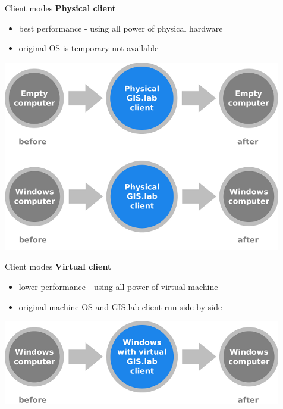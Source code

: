 \documentclass[12pt]{beamer}
\begin{document}
\begin{frame}{Client modes}
	\textbf{Physical client}
	\begin{itemize}
		\item best performance - using all power of physical hardware
		\item original OS is temporary not available 
	\end{itemize}
	\begin{center}
		\includegraphics[keepaspectratio=true,height=0.6\textheight]{images/schema-physical-client.png}
	\end{center}
\end{frame}


\begin{frame}{Client modes}
	\textbf{Virtual client}
	\begin{itemize}
		\item lower performance - using all power of virtual machine
		\item original machine OS and GIS.lab client run side-by-side
	\end{itemize}
	\begin{center}
		\includegraphics[keepaspectratio=true,height=0.4\textheight]{images/schema-virtual-client.png}
	\end{center}
\end{frame}
\end{document}
